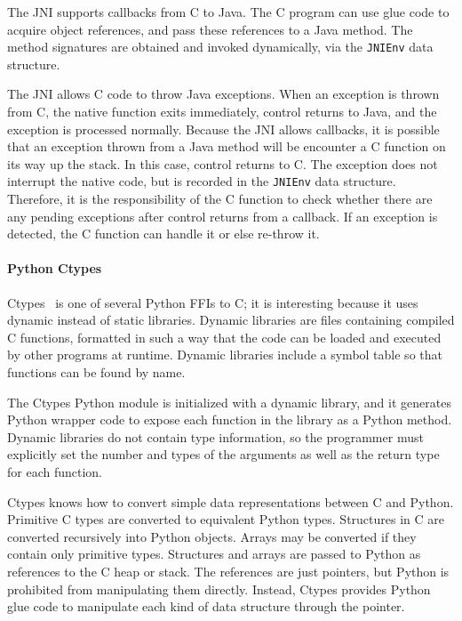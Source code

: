 The JNI supports callbacks from C to Java. The C program can use
glue code to acquire object references, and pass these references
to a Java method. The method signatures are obtained and invoked
dynamically, via the \texttt{JNIEnv} data structure.

The JNI allows C code to throw Java exceptions. When an exception
is thrown from C, the native function exits immediately, control
returns to Java, and the exception is processed normally. Because
the JNI allows callbacks, it is possible that an exception thrown
from a Java method will be encounter a C function on its way up
the stack. In this case, control returns to C. The exception does
not interrupt the native code, but is recorded in the
\texttt{JNIEnv} data structure. Therefore, it is the
responsibility of the C function to check whether there are any
pending exceptions after control returns from a callback. If an
exception is detected, the C function can handle it or else
re-throw it.

\paragraph{Python Ctypes}

Ctypes~\cite{kloss08ctypes, pythonctypes} is one of several Python
FFIs to C; it is interesting because it uses dynamic instead of
static libraries. Dynamic libraries are files containing compiled
C functions, formatted in such a way that the code can be loaded
and executed by other programs at runtime. Dynamic libraries
include a symbol table so that functions can be found by name.

The Ctypes Python module is initialized with a dynamic library,
and it generates Python wrapper code to expose each function in
the library as a Python method. Dynamic libraries do not contain
type information, so the programmer must explicitly set the number
and types of the arguments as well as the return type for each
function.

Ctypes knows how to convert simple data representations between C
and Python. Primitive C types are converted to equivalent Python
types. Structures in C are converted recursively into Python
objects. Arrays may be converted if they contain only primitive
types. Structures and arrays are passed to Python as references to
the C heap or stack. The references are just pointers, but Python
is prohibited from manipulating them directly. Instead, Ctypes
provides Python glue code to manipulate each kind of data
structure through the pointer.

